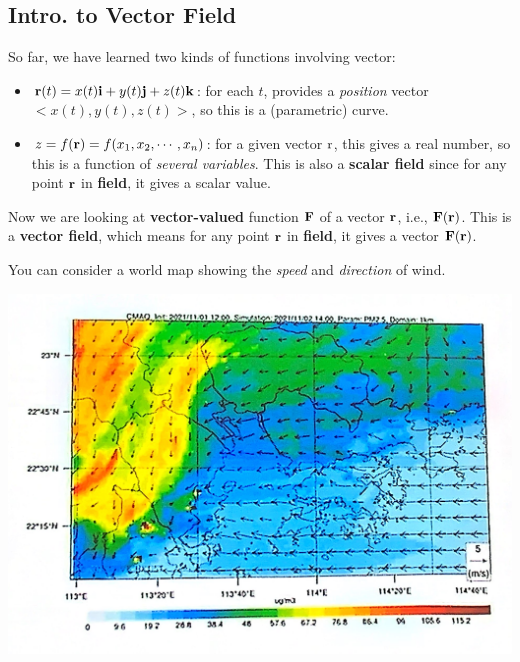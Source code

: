 
\begin{spacing}{1.3}

    \section{Intro. to Vector Field}

    So far, we have learned two kinds of functions involving vector: 
    \begin{itemize}
        \item ${\bf r}(t)=x(t){\bf i}+y(t){\bf j}+z(t){\bf k}$: for each $t$, provides a {\it position} vector 
        $<x(t), y(t), z(t)>$, so this is a (parametric) curve.
        \item $z=f({\bf r})=f(x_1,x_2,\cdots,x_n)$: for a given vector ${\rm r}$, this gives a real number,
        so this is a function of {\it several variables}. This is also a {\bf scalar field} since for 
        any point ${\bf r}$ in {\bf field}, it gives a scalar value. 
    \end{itemize}
    Now we are looking at {\bf vector-valued} function ${\bf F}$ of a vector ${\bf r}$, i.e., ${\bf F(r)}$.
    This is a {\bf vector field}, which means for any point ${\bf r}$ in {\bf field}, it gives a vector 
    ${\bf F(r)}$. 

    You can consider a world map showing the {\it speed} and {\it direction} of wind.
    
    \newpage
    \begin{center}
        \includegraphics[scale=0.14]{images/Ch15-wind.JPG}
    \end{center}


\end{spacing}

